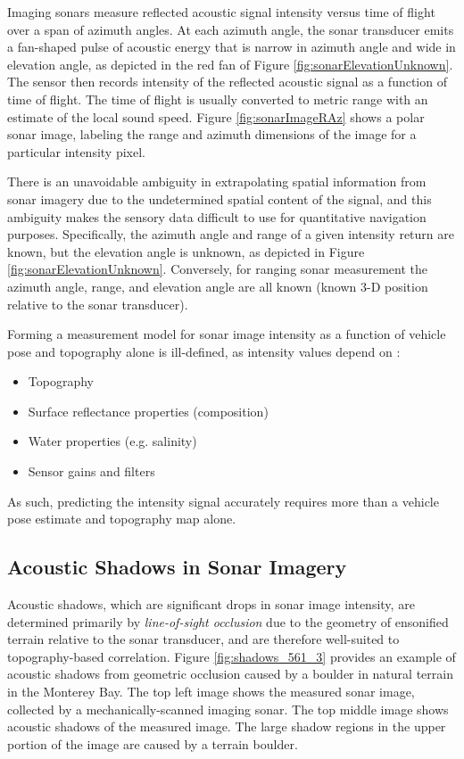 Imaging sonars measure reflected acoustic signal intensity versus time of flight over a span of azimuth angles.
At each azimuth angle, the sonar transducer emits a fan-shaped pulse of acoustic energy that is narrow in azimuth angle and wide in elevation angle, as depicted in the red fan of Figure \ref{fig:sonarElevationUnknown}.
The sensor then records intensity of the reflected acoustic signal as a function of time of flight.
The time of flight is usually converted to metric range with an estimate of the local sound speed.
Figure \ref{fig:sonarImageRAz} shows a polar sonar image, labeling the range and azimuth dimensions of the image for a particular intensity pixel.

There is an unavoidable ambiguity in extrapolating spatial information from sonar imagery due to the undetermined spatial content of the signal, and this ambiguity makes the sensory data difficult to use for quantitative navigation purposes.  
Specifically, the azimuth angle and range of a given intensity return are known, but the elevation angle is unknown, as depicted in Figure \ref{fig:sonarElevationUnknown}.
Conversely, for ranging sonar measurement the azimuth angle, range, and elevation angle are all known (known 3-D position relative to the sonar transducer).

Forming a measurement model for sonar image intensity as a function of vehicle pose and topography alone is ill-defined, as intensity values depend on \cite{Bell1995}:

\begin{itemize}
\item Topography
\item Surface reflectance properties (composition)
\item Water properties (e.g. salinity)
\item Sensor gains and filters
\end{itemize}

\noindent As such, predicting the intensity signal accurately requires more than a vehicle pose estimate and topography map alone. 

\subsection{Acoustic Shadows in Sonar Imagery}
\label{intro.Shadows}

Acoustic shadows, which are significant drops in sonar image intensity, are determined primarily by \emph{line-of-sight occlusion} due to the geometry of ensonified terrain relative to the sonar transducer, and are therefore well-suited to topography-based correlation.
Figure \ref{fig:shadows_561_3} provides an example of acoustic shadows from geometric occlusion caused by a boulder in natural terrain in the Monterey Bay.  
The top left image shows the measured sonar image, collected by a mechanically-scanned imaging sonar.
The top middle image shows acoustic shadows of the measured image.
The large shadow regions in the upper portion of the image are caused by a terrain boulder.

